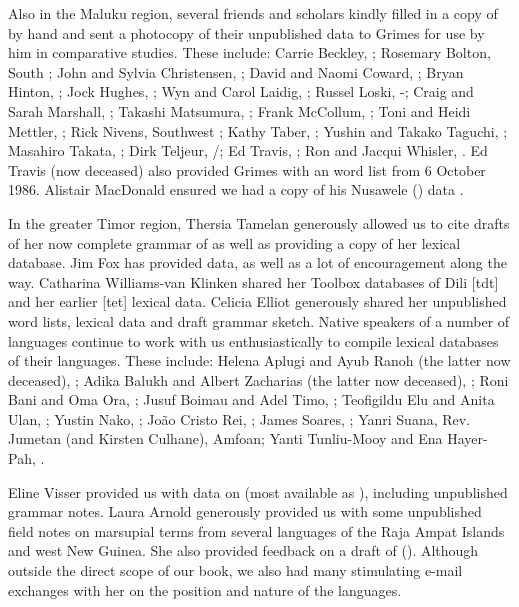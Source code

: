 Also in the Maluku region,
several friends and scholars kindly filled in a copy of \citet{GrimesC1990}
by hand and sent a photocopy of their unpublished data to Grimes
for use by him in comparative studies.
These include: Carrie Beckley, ; Rosemary Bolton, South ;
John and Sylvia Christensen,
; David and Naomi Coward, ; Bryan Hinton, ;
Jock Hughes, ; Wyn and Carol Laidig,
; Russel Loski, -; Craig and Sarah Marshall, ; Takashi Matsumura,
; Frank McCollum, ; Toni and Heidi Mettler, ; Rick Nivens,
Southwest ; Kathy Taber, ; Yushin and Takako Taguchi,
; Masahiro Takata, ; Dirk Teljeur, /; Ed Travis,
; Ron and Jacqui Whisler, .
Ed Travis (now deceased) also provided Grimes with an
 word list from 6 October 1986.
Alistair MacDonald ensured we had a copy of his
Nusawele () data \citep{MacDonald2015}.

In the greater Timor region,
Thersia Tamelan generously allowed us to cite drafts of her now complete
grammar of  as well as providing a copy of her lexical database.
Jim Fox has provided  data,
as well as a lot of encouragement along the way.
Catharina Williams-van Klinken shared her Toolbox databases
of  Dili [tdt] and her earlier  [tet] lexical data.
Celicia Elliot generously shared her unpublished  word lists,
lexical data and draft grammar sketch.
Native speakers of a number of languages continue to work
with us enthusiastically to compile lexical databases of their languages.
These include: Helena Aplugi and Ayub Ranoh (the latter now deceased),
; Adika Balukh and Albert Zacharias (the latter now deceased),
; Roni Bani and Oma Ora,
 ; Jusuf Boimau and Adel Timo,
; Teofigildu Elu and Anita Ulan,
; Yustin Nako, ; João Cristo Rei,
; James Soares, ; Yanri Suana,
Rev. Jumetan (and Kirsten Culhane),
Amfo{\Q}an; Yanti Tunliu-Mooy and Ena Hayer-Pah, .

Eline Visser provided us with data on  (most available as \citealp{Visser2019b,Visser2023}),
including unpublished grammar notes.
Laura Arnold generously provided us with some unpublished field notes on
marsupial terms from several languages of the Raja Ampat Islands and west New Guinea.
She also provided feedback on a draft of  ().
Although outside the direct scope of our book,
we also had many stimulating e-mail exchanges with
her on the position and nature of the  languages.

